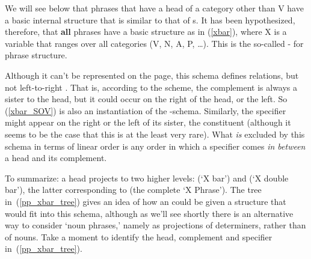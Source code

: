 \documentclass{article}
\begin{document}
We will see below that phrases that have a head of a category other than V have a basic internal structure that is similar to that of s.
It has been hypothesized, therefore, that \textbf{all} phrases have a basic structure as in (\ref{xbar}), where X is a variable that ranges over all categories (V, N, A, P, \dots). This is the so-called - for phrase structure. %
\begin{exe}
\begin{multicols}{2}
    \label{xbar}
\columnbreak
    \label{xbar_SOV}
    \end{multicols}
\end{exe}
Although it can't be represented on the page, this schema defines  relations, but not left-to-right .
That is, according to the scheme, the complement is always a sister to the head, but it could occur on the right of the head, or the left.
So (\ref{xbar_SOV}) is also an instantiation of the -schema.
Similarly, the specifier might appear on the right or the left of its sister, the  constituent (although it seems to be the case that this is at the least very rare).
What \emph{is} excluded by this schema in terms of linear order is any order in which a specifier comes \emph{in between} a head and its complement.
 
To summarize: a head  projects to two higher levels:  (`X bar') and  (`X double bar'), the latter corresponding to  (the complete `X Phrase'). The tree in~(\ref{pp_xbar_tree}) gives an idea of how an  could be given a structure that would fit into this schema, although as we'll see shortly there is an alternative way to consider `noun phrases,' namely as projections of determiners, rather than of nouns. Take a moment to identify the head, complement and specifier in~(\ref{pp_xbar_tree}).
\begin{exe}
    \label{pp_xbar_tree}
\end{exe}
\end{document}
